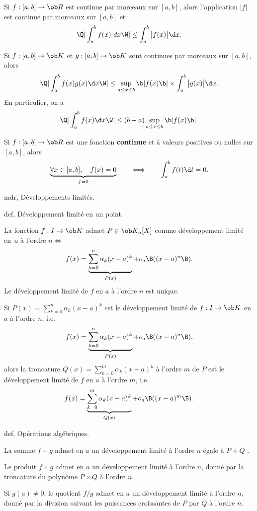\Propriete[$a\le b$] 
Si $f:[a,b]\to\ob R$ est continue par morceaux sur $[a,b]$, alors l'application $|f|$ est continue par morceaux sur $[a,b]$ et 
$$
\Q|\int_a^bf(x)\ dx\W|\le \int_a^b\big|f(x)\big|\d x.
$$ 

\Propriete [$a\le b$] 
Si $f:[a,b]\to\ob K$ et $g:[a,b]\to\ob K$ sont continues par morceaux sur $[a,b]$, alors 
$$
\Q|\int_a^bf(x)g(x)\d x\W|\le \sup_{a\le x\le b}\b|f(x)\b|\times\int_a^b\big|g(x)\big|\d x.
$$
En particulier, on a 
$$
\Q|\int_a^bf(x)\d x\W|\le (b-a)\sup_{a\le x\le b}\b|f(x)\b|.
$$



\Theoreme [$a<b$] 
Si $f:[a,b]\to\ob R$ est une fonction 
{\bf continue} et à valeurs positives ou nulles sur $[a,b]$, alors 
$$
\underbrace{\forall x\in[a,b],\quad f(x)=0}_{f=0}\qquad\Longleftrightarrow \qquad\int_a^bf(t)\d t=0.
$$

\Section mdr, Développements limités. 

\Subsection def, Développement limité en un point. 
\bigskip

\Definition [$a\in i$ intervalle] 
La fonction $f:I\to\ob K$ admet $P\in\ob K_n[X]$ comme développement limité en~$a$ à l'ordre $n\Leftrightarrow$ 
$$
f(x)=\underbrace{\sum_{k=0}^n\alpha_k(x-a)^k}_{P(x)}+o_a\B((x-a)^n\B).
$$
Le développement limité de $f$ en $a$ à l'ordre $n$ est unique. 
\bigskip

\Propriete [$a\in i$ intervalle, $0\le m\le n$] 
Si $P(x)=\sum_{k=0}^n\alpha_k(x-a)^k$ est le développement limité de $f:I\to\ob K$ en $a$ à l'ordre $n$, i.e. 
$$
f(x)=\underbrace{\sum_{k=0}^n\alpha_k(x-a)^k}_{P(x)}+o_a\B((x-a)^n\B), 
$$
alors la troncature $Q(x)=\sum_{k=0}^m\alpha_k(x-a)^k$ à l'ordre $m$ de $P$ est le développement limité 
de $f$ en $a$ à l'ordre $m$, i.e. 
$$
f(x)=\underbrace{\sum_{k=0}^m\alpha_k(x-a)^k}_{Q(x)}+o_a\B((x-a)^m\B).
$$


\Subsection def, Opérations algébriques. 

La somme $f+g$ admet en $a$ un développement limité à l'ordre $n$ égale à $P+Q$ . 


Le produit $f\times g$ admet en $a$ un développement limité à l'ordre $n$, donné par la troncature du polynôme $P\times Q$ à l'ordre $n$. 

Si $g(a)\neq0$, le quotient $f/g$ admet en $a$ un développement limité à l'ordre $n$, donné par la division suivant les puissances croissantes de $P$ par $Q$ à l'ordre $n$. 


